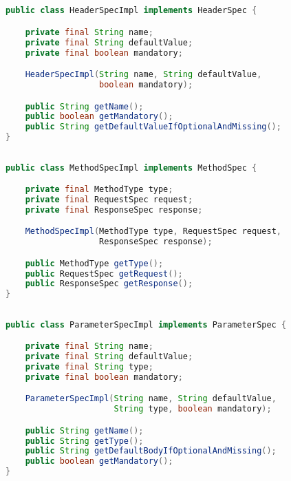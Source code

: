 \subsection{}

\begin{lstlisting}[language=Java]
public class HeaderSpecImpl implements HeaderSpec {

    private final String name;
    private final String defaultValue;
    private final boolean mandatory;

    HeaderSpecImpl(String name, String defaultValue,
                   boolean mandatory);

    public String getName();
    public boolean getMandatory();
    public String getDefaultValueIfOptionalAndMissing();
}  
\end{lstlisting}

\subsection{}

\begin{lstlisting}[language=Java]
public class MethodSpecImpl implements MethodSpec {

    private final MethodType type;
    private final RequestSpec request;
    private final ResponseSpec response;

    MethodSpecImpl(MethodType type, RequestSpec request,
                   ResponseSpec response);

    public MethodType getType();
    public RequestSpec getRequest();
    public ResponseSpec getResponse();
}
\end{lstlisting}

\subsection{}

\begin{lstlisting}[language=Java]
public class ParameterSpecImpl implements ParameterSpec {

    private final String name;
    private final String defaultValue;
    private final String type;
    private final boolean mandatory;

    ParameterSpecImpl(String name, String defaultValue,
                      String type, boolean mandatory);

    public String getName();
    public String getType();
    public String getDefaultBodyIfOptionalAndMissing();
    public boolean getMandatory();
}
\end{lstlisting}


